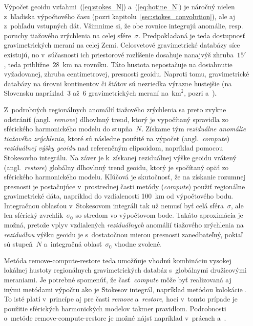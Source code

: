 \documentclass[a4paper, 12pt]{book}
\begin{document}
Výpočet geoidu vzťahmi~(\ref{eq:stokes_N}) a~(\ref{eq:hotine_N}) je náročný 
nielen z~hľadiska výpočtového času (pozri 
kapitolu~\ref{sec:stokes_convolution}), ale aj z~pohľadu vstupných dát.  
Všimnime si, že obe rovnice integrujú anomálie, resp. poruchy tiažového 
zrýchlenia na celej sfére~$\sigma$.  Predpokladaná je teda dostupnosť 
gravimetrických meraní na celej Zemi.  Celosvetové gravimetrické databázy síce 
existujú, no v~súčasnosti ich priestorové rozlíšenie dosahuje nanajvýš 
zhruba~$15'$ \parencite{EGM2008,Pail2018}, teda približne~$28$~km na rovníku.  
Táto hustota nepostačuje na dosiahnutie vyžadovanej, zhruba centimetrovej, 
presnosti geoidu.  Naproti tomu, gravimetrické databázy na úrovni kontinentov 
či štátov sú nezriedka výrazne hustejšie (na Slovensku napríklad~3 až~6 
gravimetrických meraní na~$\textrm{km}^2$, pozri \cite{Kubes2001} 
a~\cite{Zahorec2017}).

Z~podrobných regionálnych anomálií tiažového zrýchlenia sa preto zvykne 
odstrániť (angl.~\emph{remove}) dlhovlnný trend, ktorý je vypočítaný spravidla 
zo sférického harmonického modelu do stupňa~$N$.  Získame tým \emph{reziduálne 
anomálie tiažového zrýchlenia}, ktoré sú následne použité na výpočet 
(angl.~\emph{compute}) \emph{reziduálnej výšky geoidu} nad referenčným 
elipsoidom, napríklad pomocou Stokesovho integrálu.  Na záver je k~získanej 
reziduálnej výške geoidu vrátený (angl.~\emph{restore}) globálny dlhovlnný 
trend geoidu, ktorý je spočítaný opäť zo sférického harmonického modelu.  
Kľúčová je skutočnosť, že na získanie rozumnej presnosti je postačujúce 
v~prostrednej časti metódy (\emph{compute}) použiť regionálne gravimetrické 
dáta, napríklad do vzdialenosti 100~km od výpočtového bodu.  Integračnou 
oblasťou v~Stokesovom integráli tak už nemusí byť celá sféra~$\sigma$, ale len 
sférický zvrchlík~$\sigma_0$ so stredom vo výpočtovom bode.  Takáto aproximácia 
je možná, pretože vplyv vzdialených \emph{reziduálnych} anomálií tiažového 
zrýchlenia na \emph{reziduálnu} výšku geoidu je s~dostatočnou mierou presnosti 
zanedbateľný, pokiaľ sú stupeň~$N$ a~integračná oblasť~$\sigma_0$ vhodne 
zvolené.

Metóda remove-compute-restore teda umožňuje vhodnú kombináciu vysokej lokálnej 
hustoty regionálnych gravimetrických databáz s~globálnymi družicovými 
meraniami.  Je potrebné spomenúť, že časť~\emph{compute} môže byť realizovaná 
aj inými metódami výpočtu ako je Stokesov integrál, napríklad metódou kolokácie 
\parencite{MoritzAdvancedGeodesy,MoritzPhysicalGeodesy}.  To isté platí 
v~princípe aj pre časti \emph{remove} a~\emph{restore}, hoci v~tomto prípade je 
použitie sférických harmonických modelov takmer pravidlom.  Podrobnosti 
o~metóde remove-compute-restore je možné nájsť napríklad v~prácach 
\textcite{Sjoberg2005} a~\textcite{MoritzPhysicalGeodesy}.
\end{document}
